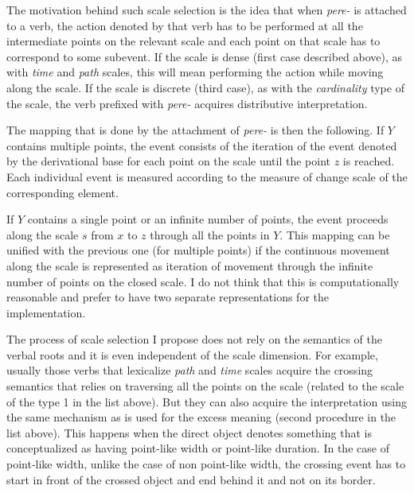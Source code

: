 
The motivation behind such scale selection is the idea that when \textit{pere-} is attached to a verb, the action denoted by that verb has to be performed at all the intermediate points on the relevant scale and each point on that scale has to correspond to some subevent. If the scale is dense (first case described above), as with \textit{time} and \textit{path} scales, this will mean performing the action while moving along the scale. If the scale is discrete (third case), as with the \textit{cardinality} type of the scale, the verb prefixed with \textit{pere-} acquires distributive interpretation. 

The mapping that is done by the attachment of \textit{pere-} is then the following. %
If $Y$ contains multiple points, the event consists of the iteration of the event denoted by the derivational base for each point on the scale until the point $z$ is reached. Each individual event is measured according to the measure of change scale of the corresponding element.

If $Y$ contains a single point or an infinite number of points, the event proceeds along the scale $s$ from $x$ to $z$ through all the points in $Y$. This mapping can be unified with the previous one (for multiple points) if the continuous movement along the scale is represented as iteration of movement through the infinite number of points on the closed scale. I do not think that this is computationally reasonable and prefer to have two separate representations for the implementation.

The process of scale selection I propose does not rely on the semantics of the verbal roots and it is even independent of the scale dimension. For example, usually those verbs that lexicalize \textit{path} and \textit{time} scales acquire the crossing semantics that relies on traversing all the points on the scale (related to the scale of the type 1 in the list above). But they can also acquire the interpretation using the same mechanism as is used for the excess meaning (second procedure in the list above). This happens when the direct object denotes something that is conceptualized as having point-like width or point-like duration. In the case of point-like width, unlike the case of non point-like width, the crossing event has to start in front of the crossed object and end behind it and not on its border.

